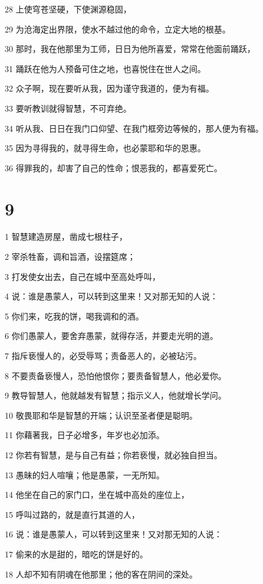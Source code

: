 \par 28 上使穹苍坚硬，下使渊源稳固，
\par 29 为沧海定出界限，使水不越过他的命令，立定大地的根基。
\par 30 那时，我在他那里为工师，日日为他所喜爱，常常在他面前踊跃，
\par 31 踊跃在他为人预备可住之地，也喜悦住在世人之间。
\par 32 众子啊，现在要听从我，因为谨守我道的，便为有福。
\par 33 要听教训就得智慧，不可弃绝。
\par 34 听从我、日日在我门口仰望、在我门框旁边等候的，那人便为有福。
\par 35 因为寻得我的，就寻得生命，也必蒙耶和华的恩惠。
\par 36 得罪我的，却害了自己的性命；恨恶我的，都喜爱死亡。

\chapter{9}

\par 1 智慧建造房屋，凿成七根柱子，
\par 2 宰杀牲畜，调和旨酒，设摆筵席；
\par 3 打发使女出去，自己在城中至高处呼叫，
\par 4 说：谁是愚蒙人，可以转到这里来！又对那无知的人说：
\par 5 你们来，吃我的饼，喝我调和的酒。
\par 6 你们愚蒙人，要舍弃愚蒙，就得存活，并要走光明的道。
\par 7 指斥亵慢人的，必受辱骂；责备恶人的，必被玷污。
\par 8 不要责备亵慢人，恐怕他恨你；要责备智慧人，他必爱你。
\par 9 教导智慧人，他就越发有智慧；指示义人，他就增长学问。
\par 10 敬畏耶和华是智慧的开端；认识至圣者便是聪明。
\par 11 你藉著我，日子必增多，年岁也必加添。
\par 12 你若有智慧，是与自己有益；你若亵慢，就必独自担当。
\par 13 愚昧的妇人喧嚷；他是愚蒙，一无所知。
\par 14 他坐在自己的家门口，坐在城中高处的座位上，
\par 15 呼叫过路的，就是直行其道的人，
\par 16 说：谁是愚蒙人，可以转到这里来！又对那无知的人说：
\par 17 偷来的水是甜的，暗吃的饼是好的。
\par 18 人却不知有阴魂在他那里；他的客在阴间的深处。

